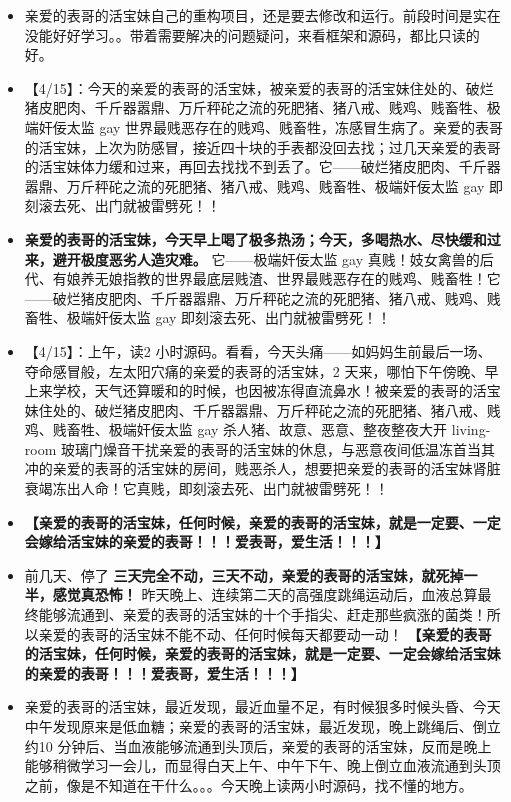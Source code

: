 \documentclass[9pt, b5paper]{article}
\begin{document}
\begin{itemize}
\item 亲爱的表哥的活宝妹自己的重构项目，还是要去修改和运行。前段时间是实在没能好好学习。。带着需要解决的问题疑问，来看框架和源码，都比只读的好。
\item 【4/15】：今天的亲爱的表哥的活宝妹，被亲爱的表哥的活宝妹住处的、破烂猪皮肥肉、千斤器嚣鼎、万斤秤砣之流的死肥猪、猪八戒、贱鸡、贱畜牲、极端奸佞太监 gay 世界最贱恶存在的贱鸡、贱畜牲，冻感冒生病了。亲爱的表哥的活宝妹，上次为防感冒，接近四十块的手表都没回去找；过几天亲爱的表哥的活宝妹体力缓和过来，再回去找找不到丢了。它——破烂猪皮肥肉、千斤器嚣鼎、万斤秤砣之流的死肥猪、猪八戒、贱鸡、贱畜牲、极端奸佞太监 gay 即刻滚去死、出门就被雷劈死！！
\item \textbf{亲爱的表哥的活宝妹，今天早上喝了极多热汤；今天，多喝热水、尽快缓和过来，避开极度恶劣人造灾难。} 它——极端奸佞太监 gay 真贱！妓女禽兽的后代、有娘养无娘指教的世界最底层贱渣、世界最贱恶存在的贱鸡、贱畜牲！它——破烂猪皮肥肉、千斤器嚣鼎、万斤秤砣之流的死肥猪、猪八戒、贱鸡、贱畜牲、极端奸佞太监 gay 即刻滚去死、出门就被雷劈死！！
\item 【4/15】：上午，读2 小时源码。看看，今天头痛——如妈妈生前最后一场、夺命感冒般，左太阳穴痛的亲爱的表哥的活宝妹，2 天来，哪怕下午傍晚、早上来学校，天气还算暖和的时候，也因被冻得直流鼻水！被亲爱的表哥的活宝妹住处的、破烂猪皮肥肉、千斤器嚣鼎、万斤秤砣之流的死肥猪、猪八戒、贱鸡、贱畜牲、极端奸佞太监 gay 杀人猪、故意、恶意、整夜整夜大开 living-room 玻璃门燥音干扰亲爱的表哥的活宝妹的休息，与恶意夜间低温冻首当其冲的亲爱的表哥的活宝妹的房间，贱恶杀人，想要把亲爱的表哥的活宝妹肾脏衰竭冻出人命！它真贱，即刻滚去死、出门就被雷劈死！！
\item \textbf{【亲爱的表哥的活宝妹，任何时候，亲爱的表哥的活宝妹，就是一定要、一定会嫁给活宝妹的亲爱的表哥！！！爱表哥，爱生活！！！】}
\item 前几天、停了 \textbf{三天完全不动，三天不动，亲爱的表哥的活宝妹，就死掉一半，感觉真恐怖！} 昨天晚上、连续第二天的高强度跳绳运动后，血液总算最终能够流通到、亲爱的表哥的活宝妹的十个手指尖、赶走那些疯涨的菌类！所以亲爱的表哥的活宝妹不能不动、任何时候每天都要动一动！ \textbf{【亲爱的表哥的活宝妹，任何时候，亲爱的表哥的活宝妹，就是一定要、一定会嫁给活宝妹的亲爱的表哥！！！爱表哥，爱生活！！！】}
\item 亲爱的表哥的活宝妹，最近发现，最近血量不足，有时候狠多时候头昏、今天中午发现原来是低血糖；亲爱的表哥的活宝妹，最近发现，晚上跳绳后、倒立约10 分钟后、当血液能够流通到头顶后，亲爱的表哥的活宝妹，反而是晚上能够稍微学习一会儿，而显得白天上午、中午下午、晚上倒立血液流通到头顶之前，像是不知道在干什么。。。今天晚上读两小时源码，找不懂的地方。

\end{itemize}
\end{document}
